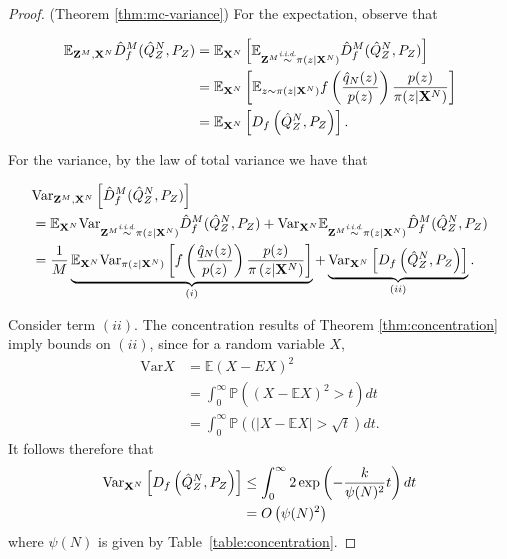 \begin{proof}(Theorem \ref{thm:mc-variance})
For the expectation, observe that

\begin{align*}
    \mathbb{E}_{\mathbf{Z}^M, \mathbf{X}^N} \hat{D}^M_f( \hat{Q}_Z^N , P_Z)
    &=\mathbb{E}_{\mathbf{X}^N} \left[ \mathbb{E}_{\mathbf{Z}^M \overset{\text{\emph{i.i.d.}}}{\sim} \pi(z | \mathbf{X}^N)} \hat{D}^M_f( \hat{Q}_Z^N , P_Z)\right] \\
    &= \mathbb{E}_{\mathbf{X}^N} \left[ \mathbb{E}_{z \sim \pi(z | \mathbf{X}^N)} f\left(\frac{\hat{q}_N(z)}{p(z)} \right) \frac{p(z)}{\pi(z|\mathbf{X}^N)} \right] \\
    &=\mathbb{E}_{\mathbf{X}^N} \left[ D_f\left( \hat{Q}^N_Z , P_Z \right)\right].
\end{align*}

For the variance, by the law of total variance we have that

\begin{align*}
    &\text{Var}_{\mathbf{Z}^M, \mathbf{X}^N} \left[\hat{D}^M_f( \hat{Q}_Z^N , P_Z)  \right]  \\
    &= \mathbb{E}_{\mathbf{X}^N} \text{Var}_{\mathbf{Z}^M \overset{\text{\emph{i.i.d.}}}{\sim} \pi(z|\mathbf{X}^N)} \hat{D}^M_f( \hat{Q}_Z^N , P_Z) + \text{Var}_{\mathbf{X}^N} \mathbb{E}_{\mathbf{Z}^M \overset{\text{\emph{i.i.d.}}}{\sim} \pi(z|\mathbf{X}^N)} \hat{D}^M_f( \hat{Q}_Z^N , P_Z)
    \\
    &=\frac{1}{M} \underbrace{\mathbb{E}_{\mathbf{X}^N} \text{Var}_{\pi(z|\mathbf{X}^N)} \left[ f\left( \frac{\hat{q}_N(z)}{p(z)} \right) \frac{p(z)}{\pi\left(z|\mathbf{X}^N\right)} \right]}_{(i)}  + \underbrace{\text{Var}_{\mathbf{X}^N} \left[D_f\left( \hat{Q}^N_Z , P_Z \right)\right]}_{(ii)}.
\end{align*}

Consider term $(ii)$.
The concentration results of Theorem \ref{thm:concentration} imply bounds on $(ii)$, since for a random variable $X$,
\begin{align*}
    \text{Var}X &= \mathbb{E} (X - EX)^2 \\
    &= \int_0^\infty \mathbb{P}\left( (X - \mathbb{E} X)^2 > t \right) dt \\
    &= \int_0^\infty \mathbb{P} \left(( \left| X - \mathbb{E} X \right| > \sqrt{t} \right) dt.
\end{align*}
It follows therefore that
\begin{align*}
    \text{Var}_{\mathbf{X}^N} \left[D_f\left( \hat{Q}^N_Z , P_Z \right)\right] 
    &\leq \int_0^\infty 2 \exp\left( -\frac{k}{\psi(N)^2}t \right) dt\\
    &= O\left(\psi(N)^2 \right)
\end{align*}
where $\psi(N)$ is given by Table~\ref{table:concentration}.


\end{proof}
